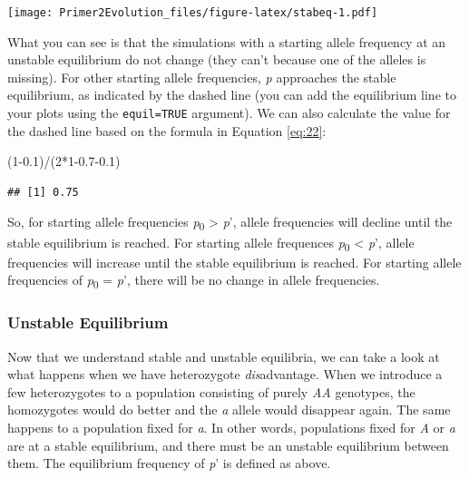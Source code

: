 \documentclass[
]{book}
\newenvironment{Shaded}{\begin{snugshade}}{\end{snugshade}}
\newcommand{\DecValTok}[1]{\textcolor[rgb]{0.00,0.00,0.81}{#1}}
\newcommand{\FloatTok}[1]{\textcolor[rgb]{0.00,0.00,0.81}{#1}}
\newcommand{\NormalTok}[1]{#1}
\newcommand{\SpecialCharTok}[1]{\textcolor[rgb]{0.00,0.00,0.00}{#1}}
\begin{document}
\texttt{[image: Primer2Evolution\_files/figure-latex/stabeq-1.pdf]}

What you can see is that the simulations with a starting allele frequency at an unstable equilibrium do not change (they can't because one of the alleles is missing). For other starting allele frequencies, \emph{p} approaches the stable equilibrium, as indicated by the dashed line (you can add the equilibrium line to your plots using the \texttt{equil=TRUE} argument). We can also calculate the value for the dashed line based on the formula in Equation \eqref{eq:22}:

\begin{Shaded}
\begin{Highlighting}[]
\NormalTok{(}\DecValTok{1}\FloatTok{{-}0.1}\NormalTok{)}\SpecialCharTok{/}\NormalTok{(}\DecValTok{2}\SpecialCharTok{*}\DecValTok{1}\FloatTok{{-}0.7{-}0.1}\NormalTok{)}
\end{Highlighting}
\end{Shaded}

\begin{verbatim}
## [1] 0.75
\end{verbatim}

So, for starting allele frequencies \emph{p}\textsubscript{0} \textgreater{} \emph{p}', allele frequencies will decline until the stable equilibrium is reached. For starting allele frequences \emph{p}\textsubscript{0} \textless{} \emph{p}', allele frequencies will increase until the stable equilibrium is reached. For starting allele frequencies of \emph{p}\textsubscript{0} = \emph{p}', there will be no change in allele frequencies.

\hypertarget{unstable-equilibrium}{%
\subsubsection*{Unstable Equilibrium}\label{unstable-equilibrium}}

Now that we understand stable and unstable equilibria, we can take a look at what happens when we have heterozygote \emph{dis}advantage. When we introduce a few heterozygotes to a population consisting of purely \emph{AA} genotypes, the homozygotes would do better and the \emph{a} allele would disappear again. The same happens to a population fixed for \emph{a}. In other words, populations fixed for \emph{A} or \emph{a} are at a stable equilibrium, and there must be an unstable equilibrium between them. The equilibrium frequency of \emph{p}' is defined as above.
\end{document}
